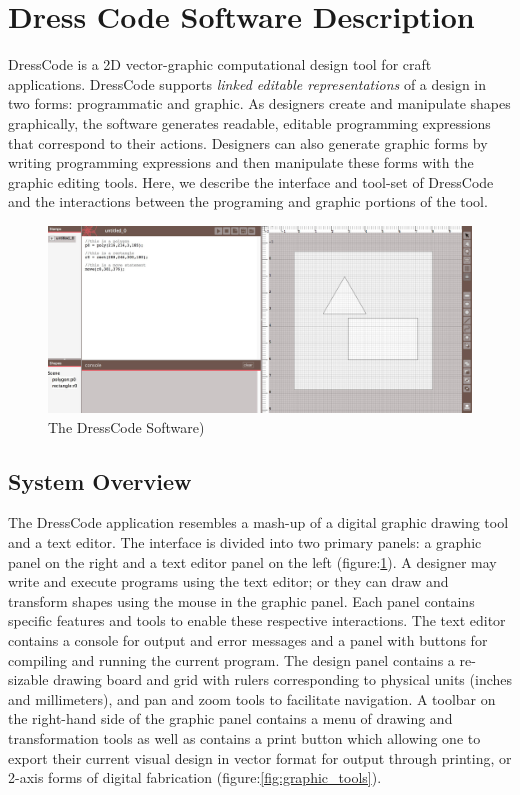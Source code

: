 \documentclass{sigchi}
\begin{document}
\section{Dress Code Software Description}
DressCode is a 2D vector-graphic computational design tool for craft applications. DressCode supports \emph{linked editable representations} of a design in two forms: programmatic and graphic. As designers create and manipulate shapes graphically, the software generates readable, editable programming expressions that correspond to their actions. Designers can also generate graphic forms by writing programming expressions and then manipulate these forms with the graphic editing tools. Here, we describe the interface and tool-set of DressCode and the interactions between the programing and graphic portions of the tool.

\begin{figure}
\includegraphics[width=\textwidth]{images/application_image_sm_content.jpg}
\caption{The DressCode Software)}
\label{fig:application_image}
\end{figure}

\subsection{System Overview}
The DressCode application resembles a mash-up of a digital graphic drawing tool and a text editor. The interface is divided into two primary panels: a graphic panel on the right and a text editor panel on the left (figure:\ref{fig:application_image}). A designer may write and execute programs using the text editor; or they can draw and transform shapes using the mouse in the graphic panel. Each panel contains specific features and tools to enable these respective interactions. The text editor contains a console for output and error messages and a panel with buttons for compiling and running the current program. The design panel contains a re-sizable drawing board and grid with rulers corresponding to physical units (inches and millimeters), and pan and zoom tools to facilitate navigation. A toolbar on the right-hand side of the graphic panel contains a menu of drawing and transformation tools as well as contains a print button which allowing one to export their current visual design in vector format for output through printing, or 2-axis forms of digital fabrication (figure:\ref{fig:graphic_tools}).
\end{document}
